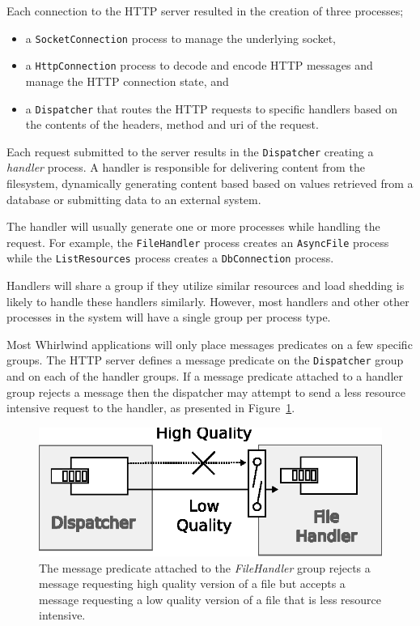 \documentclass[conference]{IEEEtran}
\begin{document}
Each connection to the HTTP server resulted in the creation of three processes;

\begin{itemize}
	\item a \verb+SocketConnection+ process to manage the underlying socket,
	\item a \verb+HttpConnection+ process to decode and encode HTTP messages and manage the HTTP connection state, and
	\item a \verb+Dispatcher+ that routes the HTTP requests to specific handlers based on the contents of the headers, method and uri of the request.
\end{itemize}

Each request submitted to the server results in the \verb+Dispatcher+ creating a \emph{handler} process. A handler is responsible for delivering content from the filesystem, dynamically generating content based based on values retrieved from a database or submitting data to an external system. 

The handler will usually generate one or more processes while handling the request. For example, the \verb+FileHandler+ process creates an \verb+AsyncFile+ process while the \verb+ListResources+ process creates a \verb+DbConnection+ process. 

Handlers will share a group if they utilize similar resources and load shedding is likely to handle these handlers similarly. However, most handlers and other other processes in the system will have a single group per process type.

Most Whirlwind applications will only place messages predicates on a few specific groups. The HTTP server defines a message predicate on the \verb+Dispatcher+ group and on each of the handler groups. If a message predicate attached to a handler group rejects a message then the dispatcher may attempt to send a less resource intensive request to the handler, as presented in Figure~\ref{figure:message-predicate}.

\begin{figure}[htbp]
\centering
\includegraphics[width=\linewidth]{message-predicate.eps}
\caption{The message predicate attached to the \emph{FileHandler} group rejects a message requesting high quality version of a file but accepts a message requesting a low quality version of a file that is less resource intensive.}
\label{figure:message-predicate}
\end{figure}
\end{document}
